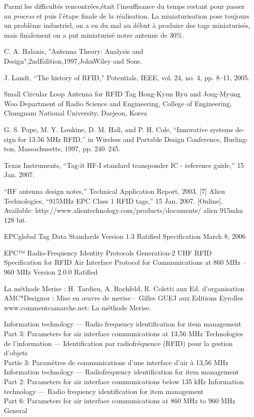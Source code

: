 \documentclass[11pt, a4paper, twoside]{book}
\begin{document}
Parmi les difficultés rencontrées,était l'insuffisance du temps restant pour passer  au \emph{process} et puis l'étape finale de la réalisation. La miniaturisation pose toujours un problème industriel, on a eu du mal au début à produire des tags miniaturisés, mais finalement on  a put miniaturisé notre antenne de 30\%.\\

\begin{thebibliography}{9}

C. A. Balanis, "Antenna Theory: Analysis and
Design",2ndEdition,1997,JohnWiley and Sons.
 



  J. Landt, “The history of RFID,” Potentials, IEEE, vol. 24, no. 4, pp. 8–11, 2005.

 Small Circular Loop Antenna for RFID Tag
Hong-Kyun Ryu and Jong-Myung Woo
Department of Radio Science and Engineering, College of Engineering, Chungnam National University, Daejeon, Korea

 G. S. Pope, M. Y. Loukine, D. M. Hall, and P. H. Cole, “Innovative systems de- sign for 13.56 MHz RFID,” in Wireless and Portable Design Conference, Burling- ton, Massachusetts, 1997, pp. 240–245.

  Texas Instruments, “Tag-it HF-I standard transponder IC - reference guide,” 15 Jan. 2007. 

  “HF antenna design notes,” Technical Application Report, 2003.
[7] Alien Technologies, “915MHz EPC Class 1 RFID tags,” 15 Jan. 2007. [Online]. Available: http://www.alientechnology.com/products/documents/
alien 915mhz 128 bit.%

  EPCglobal Tag Data Standards Version 1.3 Ratified Specification
March 8, 2006

 EPC™ Radio-Frequency Identity Protocols Generation-2 UHF RFID
Specification for RFID Air Interface Protocol for Communications at 860 MHz – 960 MHz 
Version 2.0.0 Ratified

  La méthode Merise : H. Tardieu, A. Rochfeld, R. Coletti aux Ed. d’organisation
AMC*Designor : Mise en œuvre de merise – Gilles GUEJ aux Editions Eyrolles
www.commentcamarche.net: La méthode Merise. 

 Information technology — Radio frequency identification for item management\\
Part 3: Parameters for air interface communications at 13,56 MHz
Technologies de l'information — Identification par radiofréquence (RFID) pour la gestion d'objets \\
Partie 3: Paramètres de communications d'une interface d'air à
13,56 MHz 
Information technology — Radiofrequency identification for item management \\
Part 2:
Parameters for air interface
communications below 135 kHz 
Information technology — Radio
frequency identification for item
management\\
Part 6:
Parameters for air interface
communications at 860 MHz to 960 MHz
General 


\end{thebibliography}
\end{document}
